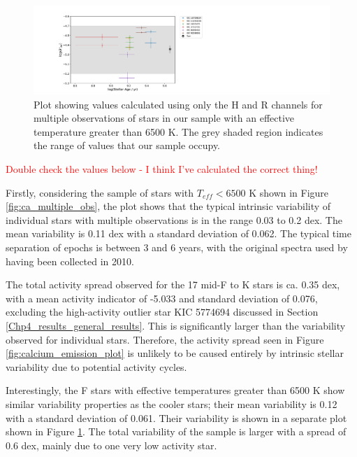 \begin{figure}
    \centering
    \includegraphics[scale=0.55]{Figures/4-Chromospheric_age/hot_multiple_obs_plot_with_sun.pdf}
    \caption[Plot showing activity over several epochs for stars with $T_{eff} > 6500$ K]{Plot showing \Rprime values calculated using only the H and R channels for multiple observations of stars in our sample with an effective temperature greater than 6500 K. The grey shaded region indicates the range of \Rprime values that our sample occupy.}
    \label{fig:ca_multiple_obs_hot_Fstars}
\end{figure}

\textcolor{red}{Double check the values below - I think I've calculated the correct thing!}

Firstly, considering the sample of stars with $T_{eff} < 6500$ K shown in Figure \ref{fig:ca_multiple_obs}, the plot shows that the typical intrinsic variability of individual stars with multiple observations is in the range 0.03 to 0.2 dex. The mean variability is 0.11 dex with a standard deviation of 0.062. The typical time separation of epochs is between 3 and 6 years, with the original spectra used by \citet{Bruntt_etal_2012} having been collected in 2010.

The total activity spread observed for the 17 mid-F to K stars is ca. 0.35 dex, with a mean \Rprime activity indicator of -5.033 and standard deviation of 0.076, excluding the high-activity outlier star KIC 5774694 discussed in Section \ref{Chp4_results_general_results}. This is significantly larger than the variability observed for individual stars. Therefore, the activity spread seen in Figure \ref{fig:calcium_emission_plot} is unlikely to be caused entirely by intrinsic stellar variability due to potential activity cycles.

Interestingly, the F stars with effective temperatures greater than 6500 K show similar variability properties as the cooler stars; their mean variability is 0.12 with a standard deviation of 0.061. Their variability is shown in a separate plot shown in Figure \ref{fig:ca_multiple_obs_hot_Fstars}. The total variability of the sample is larger with a spread of 0.6 dex, mainly due to one very low activity star.


